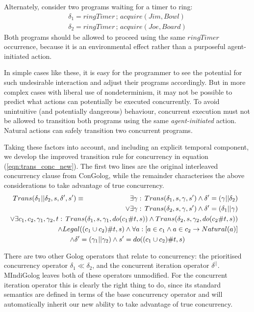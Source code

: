 Alternately, consider two programs waiting for a timer to ring:\begin{gather*}
\delta_{1}=ringTimer\,;\, acquire(Jim,Bowl)\\
\delta_{2}=ringTimer\,;\, acquire(Joe,Board)\end{gather*}
 Both programs should be allowed to proceed using the same $ringTimer$
occurrence, because it is an environmental effect rather than a purposeful
agent-initiated action.

In simple cases like these, it is easy for the programmer to see the
potential for such undesirable interaction and adjust their programs
accordingly. But in more complex cases with liberal use of nondeterminism,
it may not be possible to predict what actions can potentially be
executed concurrently. To avoid unintuitive (and potentially dangerous)
behaviour, concurrent execution must not be allowed to transition
both programs using the same \emph{agent-initiated} action. Natural
actions can safely transition two concurrent programs.

Taking these factors into account, and including an explicit temporal
component, we develop the improved transition rule for concurrency
in equation (\ref{eqn:trans_conc_new}). The first two lines are the
original interleaved concurrency clause from ConGolog, while the remainder
characterises the above considerations to take advantage of true concurrency.\begin{multline}
Trans(\delta_{1}||\delta_{2},s,\delta',s')\equiv\,\,\,\,\,\,\,\,\,\,\,\,\,\,\,\,\,\,\,\,\,\,\,\,\,\,\,\,\,\,\,\,\,\,\,\,\,\,\,\shoveright{\exists\gamma:\, Trans(\delta_{1},s,\gamma,s')\wedge\delta'=(\gamma||\delta_{2})}\\
\shoveright{\vee\exists\gamma:\, Trans(\delta_{2},s,\gamma,s')\wedge\delta'=(\delta_{1}||\gamma)}\\
\shoveright{\vee\exists c_{1},c_{2},\gamma_{1},\gamma_{2},t:\, Trans(\delta_{1},s,\gamma_{1},do(c_{1}\#t,s))\wedge Trans(\delta_{2},s,\gamma_{2},do(c_{2}\#t,s))}\\
\shoveright{\wedge Legal((c_{1}\cup c_{2})\#t,s)\wedge\forall a:\left[a\in c_{1}\wedge a\in c_{2}\rightarrow Natural(a)\right]}\\
\wedge\delta'=(\gamma_{1}||\gamma_{2})\wedge s'=do((c_{1}\cup c_{2})\#t,s)\label{eqn:trans_conc_new}\end{multline}


\newpage{}There are two other Golog operators that relate to concurrency:
the prioritised concurrency operator $\delta_{1}\ll\delta_{2}$, and
the concurrent iteration operator $\delta^{||}$. MIndiGolog leaves
both of these operators unmodified. For the concurrent iteration operator
this is clearly the right thing to do, since its standard semantics
are defined in terms of the base concurrency operator and will automatically
inherit our new ability to take advantage of true concurrency.

